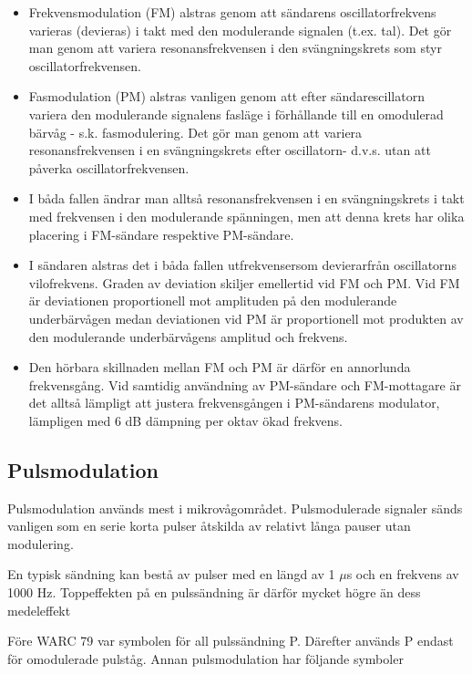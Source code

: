 \begin{itemize}
\item Frekvensmodulation (FM) alstras genom att sändarens oscillatorfrekvens
varieras (devieras) i takt med den modulerande signalen (t.ex. tal). Det gör man
genom att variera resonansfrekvensen i den svängningskrets som styr
oscillatorfrekvensen.

\item Fasmodulation (PM) alstras vanligen genom att efter sändarescillatorn
variera den modulerande signalens fasläge i förhållande till en omodulerad
bärvåg - s.k. fasmodulering. Det gör man genom att variera resonansfrekvensen i
en svängningskrets efter oscillatorn- d.v.s. utan att påverka
oscillatorfrekvensen.

\item I båda fallen ändrar man alltså resonansfrekvensen i en svängningskrets i
takt med frekvensen i den modulerande spänningen, men att denna krets har olika
placering i FM-sändare respektive PM-sändare.

\item I sändaren alstras det i båda fallen utfrekvensersom devierarfrån
oscillatorns vilofrekvens. Graden av deviation skiljer emellertid vid FM och PM.
Vid FM är deviationen proportionell mot amplituden på den modulerande
underbärvågen medan deviationen vid PM är proportionell mot produkten av den
modulerande underbärvågens amplitud och frekvens.

\item Den hörbara skillnaden mellan FM och PM är därför en annorlunda
frekvensgång. Vid samtidig användning av PM-sändare och FM-mottagare är det
alltså lämpligt att justera frekvensgången i PM-sändarens modulator, lämpligen
med 6 dB dämpning per oktav ökad frekvens.
\end{itemize}

\subsection{Pulsmodulation}

Pulsmodulation används mest i mikrovågområdet. Pulsmodulerade signaler sänds
vanligen som en serie korta pulser åtskilda av relativt långa pauser utan
modulering.

En typisk sändning kan bestå av pulser med en längd av 1 \(\mu\)s och en frekvens
av 1000 Hz. Toppeffekten på en pulssändning är därför mycket högre än dess
medeleffekt

Före WARC 79 var symbolen för all pulssändning P. Därefter används P endast för
omodulerade pulståg. Annan pulsmodulation har följande symboler

